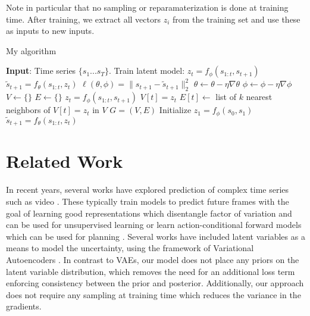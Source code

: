 \documentclass{article}
\begin{document}
Note in particular that no sampling or reparamaterization is done at training time.
After training, we extract all vectors $z_i$ from the training set and use these as inputs to new inputs.

\begin{algorithm}
  \caption{My algorithm}\label{euclid}
  \begin{algorithmic}[1]
    \State \textbf{Input}: Time series $\{s_1...s_T\}$.
    \State Train latent model:
    \State $z_t = f_{\phi}(s_{1:t}, s_{t+1})$
    \State $\tilde{s}_{t+1} = f_{\theta}(s_{1:t}, z_t)$
    \State $\ell(\theta, \phi) = \|s_{t+1} - \tilde{s}_{t+1} \|_2^2$
    \State $\theta \leftarrow \theta - \eta \nabla \theta$
    \State $\phi \leftarrow \phi - \eta \nabla \phi$
    \EndWhile
    \State $V \leftarrow \{ \}$
    \State $E \leftarrow \{ \}$
    \State $z_t = f_{\phi}(s_{1:t}, s_{t+1})$
    \State $V[t] = z_t$
    \EndFor
    \State $E[t] \leftarrow $ list of $k$ nearest neighbors of $V[t] = z_t$ in $V$
    \EndFor
    \Return $G = (V, E)$
    \EndProcedure
    \State Initialize $z_1 = f_{\phi}(s_0, s_1)$
    \State $\tilde{s}_{t+1} = f_{\theta}(s_{1:t}, z_t)$
    \EndFor
    \EndProcedure
  \end{algorithmic}
\end{algorithm}


\section{Related Work}

In recent years, several works have explored prediction of complex time series such as video \citep{mathieu-iclr-2016}.
These typically train models to predict future frames with the goal of learning good representations which disentangle factor of variation and can be used for unsupervised learning \citep{Srivastava15, Villegas17, DentonB17} or learn action-conditional forward models which can be used for planning \citep{Oh15, FinnGL16, Poke, VideoPixel}.
Several works have included latent variables as a means to model the uncertainty, using the framework of Variational Autoencoders \citep{Babaeizadeh2018, Denton2018}.
In contrast to VAEs, our model does not place any priors on the latent variable distribution, which removes the need for an additional loss term enforcing consistency between the prior and posterior.
Additionally, our approach does not require any sampling at training time which reduces the variance in the gradients.
\end{document}
